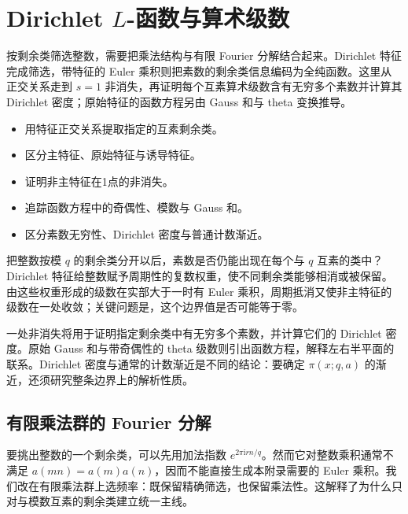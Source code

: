 \chapter{Dirichlet \texorpdfstring{\(L\)}{L}-函数与算术级数}
\label{b3:app:D}
\begin{chapterabstract}
按剩余类筛选整数，需要把乘法结构与有限 Fourier 分解结合起来。Dirichlet 特征完成筛选，带特征的 Euler 乘积则把素数的剩余类信息编码为全纯函数。这里从正交关系走到 \(s=1\) 非消失，再证明每个互素算术级数含有无穷多个素数并计算其 Dirichlet 密度；原始特征的函数方程另由 Gauss 和与 theta 变换推导。
\end{chapterabstract}
\begin{learninggoals}
\begin{itemize}
\item\label{b3:item:D-goal-1}用特征正交关系提取指定的互素剩余类。
\item\label{b3:item:D-goal-2}区分主特征、原始特征与诱导特征。
\item\label{b3:item:D-goal-3}证明非主特征在1点的非消失。
\item\label{b3:item:D-goal-4}追踪函数方程中的奇偶性、模数与 Gauss 和。
\item\label{b3:item:D-goal-5}区分素数无穷性、Dirichlet 密度与普通计数渐近。
\end{itemize}
\end{learninggoals}
把整数按模 \(q\) 的剩余类分开以后，素数是否仍能出现在每个与 \(q\) 互素的类中？Dirichlet 特征给整数赋予周期性的复数权重，使不同剩余类能够相消或被保留。由这些权重形成的级数在实部大于一时有 Euler 乘积，周期抵消又使非主特征的级数在一处收敛；关键问题是，这个边界值是否可能等于零。

一处非消失将用于证明指定剩余类中有无穷多个素数，并计算它们的 Dirichlet 密度。原始 Gauss 和与带奇偶性的 theta 级数则引出函数方程，解释左右半平面的联系。Dirichlet 密度与通常的计数渐近是不同的结论：要确定 \(\pi(x;q,a)\) 的渐近，还须研究整条边界上的解析性质。

\section{有限乘法群的 Fourier 分解}
\label{b3:sec:D01}

要挑出整数的一个剩余类，可以先用加法指数 \(e^{2\pi\mathrm{i}rn/q}\)。然而它对整数乘积通常不满足 \(a(mn)=a(m)a(n)\)，因而不能直接生成本附录需要的 Euler 乘积。我们改在有限乘法群上选频率：既保留精确筛选，也保留乘法性。这解释了为什么只对与模数互素的剩余类建立统一主线。

